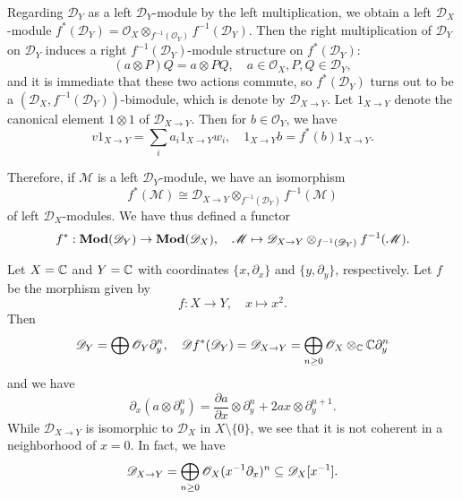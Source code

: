 Regarding $\mathscr{D}_Y$ as a left $\mathscr{D}_Y$-module by the left multiplication, we obtain a left $\mathscr{D}_X$-module $f^*(\mathscr{D}_Y)=\mathscr{O}_X\otimes_{f^{-1}(\mathscr{O}_Y)}f^{-1}(\mathscr{D}_Y)$. Then the right multiplication of $\mathscr{D}_Y$ on $\mathscr{D}_Y$ induces a right $f^{-1}(\mathscr{D}_Y)$-module structure on $f^*(\mathscr{D}_Y)$:
\[(a\otimes P)Q=a\otimes PQ,\quad a\in\mathscr{O}_X,P,Q\in\mathscr{D}_Y,\]
and it is immediate that these two actions commute, so $f^*(\mathscr{D}_Y)$ turns out to be a $(\mathscr{D}_X,f^{-1}(\mathscr{D}_Y))$-bimodule, which is denote by $\mathscr{D}_{X\to Y}$. Let $1_{X\to Y}$ denote the canonical element $1\otimes 1$ of $\mathscr{D}_{X\to Y}$. Then for $b\in\mathscr{O}_Y$, we have
\begin{equation}\label{D-module inverse image def-5}
v1_{X\to Y}=\sum_ia_i1_{X\to Y}w_i,\quad 1_{X\to Y}b=f^*(b)1_{X\to Y}.
\end{equation}

Therefore, if $\mathscr{M}$ is a left $\mathscr{D}_Y$-module, we have an isomorphism
\[f^*(\mathscr{M})\cong \mathscr{D}_{X\to Y}\otimes_{f^{-1}(\mathscr{D}_Y)}f^{-1}(\mathscr{M})\]
of left $\mathscr{D}_X$-modules. We have thus defined a functor
\[f^*:\mathbf{Mod}(\mathscr{D}_Y)\to\mathbf{Mod}(\mathscr{D}_X),\quad \mathscr{M}\mapsto \mathscr{D}_{X\to Y}\otimes_{f^{-1}(\mathscr{D}_Y)}f^{-1}(\mathscr{M}).\]

\begin{example}
Let $X=\mathbb{C}$ and $Y=\mathbb{C}$ with coordinates $\{x,\partial_x\}$ and $\{y,\partial_y\}$, respectively. Let $f$ be the morphism given by
\[f:X\to Y,\quad x\mapsto x^2.\]
Then
\[\mathscr{D}_Y=\bigoplus\mathscr{O}_Y\partial^n_y,\quad \mathscr{D}f^*(\mathscr{D}_Y)=\mathscr{D}_{X\to Y}=\bigoplus_{n\geq 0}\mathscr{O}_X\otimes_{\mathbb{C}}\mathbb{C}\partial_y^n\]
and we have
\[\partial_x(a\otimes\partial_y^n)=\frac{\partial a}{\partial x}\otimes\partial_y^n+2ax\otimes\partial_y^{n+1}.\]
While $\mathscr{D}_{X\to Y}$ is isomorphic to $\mathscr{D}_X$ in $X\setminus\{0\}$, we see that it is not coherent in a neighborhood of $x=0$. In fact, we have
\[\mathscr{D}_{X\to Y}=\bigoplus_{n\geq 0}\mathscr{O}_X(x^{-1}\partial_x)^n\subseteq\mathscr{D}_X[x^{-1}].\]
\end{example}

